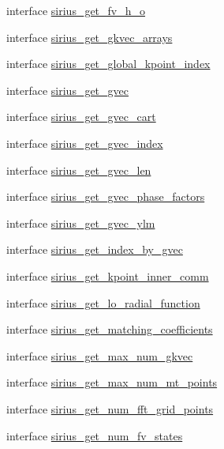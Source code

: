 \begin{DoxyCompactItemize}
interface \hyperlink{interfacesirius_1_1sirius__get__fv__h__o}{sirius\+\_\+get\+\_\+fv\+\_\+h\+\_\+o}
\item 
interface \hyperlink{interfacesirius_1_1sirius__get__gkvec__arrays}{sirius\+\_\+get\+\_\+gkvec\+\_\+arrays}
\item 
interface \hyperlink{interfacesirius_1_1sirius__get__global__kpoint__index}{sirius\+\_\+get\+\_\+global\+\_\+kpoint\+\_\+index}
\item 
interface \hyperlink{interfacesirius_1_1sirius__get__gvec}{sirius\+\_\+get\+\_\+gvec}
\item 
interface \hyperlink{interfacesirius_1_1sirius__get__gvec__cart}{sirius\+\_\+get\+\_\+gvec\+\_\+cart}
\item 
interface \hyperlink{interfacesirius_1_1sirius__get__gvec__index}{sirius\+\_\+get\+\_\+gvec\+\_\+index}
\item 
interface \hyperlink{interfacesirius_1_1sirius__get__gvec__len}{sirius\+\_\+get\+\_\+gvec\+\_\+len}
\item 
interface \hyperlink{interfacesirius_1_1sirius__get__gvec__phase__factors}{sirius\+\_\+get\+\_\+gvec\+\_\+phase\+\_\+factors}
\item 
interface \hyperlink{interfacesirius_1_1sirius__get__gvec__ylm}{sirius\+\_\+get\+\_\+gvec\+\_\+ylm}
\item 
interface \hyperlink{interfacesirius_1_1sirius__get__index__by__gvec}{sirius\+\_\+get\+\_\+index\+\_\+by\+\_\+gvec}
\item 
interface \hyperlink{interfacesirius_1_1sirius__get__kpoint__inner__comm}{sirius\+\_\+get\+\_\+kpoint\+\_\+inner\+\_\+comm}
\item 
interface \hyperlink{interfacesirius_1_1sirius__get__lo__radial__function}{sirius\+\_\+get\+\_\+lo\+\_\+radial\+\_\+function}
\item 
interface \hyperlink{interfacesirius_1_1sirius__get__matching__coefficients}{sirius\+\_\+get\+\_\+matching\+\_\+coefficients}
\item 
interface \hyperlink{interfacesirius_1_1sirius__get__max__num__gkvec}{sirius\+\_\+get\+\_\+max\+\_\+num\+\_\+gkvec}
\item 
interface \hyperlink{interfacesirius_1_1sirius__get__max__num__mt__points}{sirius\+\_\+get\+\_\+max\+\_\+num\+\_\+mt\+\_\+points}
\item 
interface \hyperlink{interfacesirius_1_1sirius__get__num__fft__grid__points}{sirius\+\_\+get\+\_\+num\+\_\+fft\+\_\+grid\+\_\+points}
\item 
interface \hyperlink{interfacesirius_1_1sirius__get__num__fv__states}{sirius\+\_\+get\+\_\+num\+\_\+fv\+\_\+states}

\end{DoxyCompactItemize}
